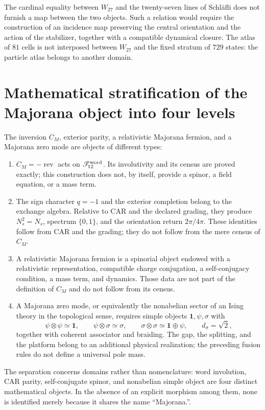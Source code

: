 The cardinal equality between \(W_{27}\) and the twenty-seven lines of Schläfli
does not furnish a map between the two objects. Such a relation would require
the construction of an incidence map preserving the central orientation and the
action of the stabilizer, together with a compatible dynamical closure. The atlas
of \(81\) cells is not interposed between \(W_{27}\) and the fixed stratum of
\(729\) states: the particle atlas belongs to another domain.

\section[Majorana Levels]{Mathematical stratification of the Majorana object into four levels}
\label{sec:cuatro-niveles-majorana}

The inversion \(C_M\), exterior parity, a relativistic Majorana
fermion, and a Majorana zero mode are objects of different types:

\begin{enumerate}
 \item \(C_M=-\operatorname{rev}\) acts on
 \(\mathscr T_{12}^{\rm word}\). Its involutivity and its census are proved
 exactly; this construction does not, by itself, provide a spinor, a
 field equation, or a mass term.

 \item The sign character \(q=-1\) and the exterior completion belong
 to the exchange algebra. Relative to CAR and the declared grading, they
 produce \(N_s^2=N_s\), spectrum \(\{0,1\}\), and the orientation return
 \(2\pi/4\pi\). These identities follow from CAR and the grading; they do not
 follow from the
 mere census of \(C_M\).

 \item A relativistic Majorana fermion is a spinorial object endowed with a
 relativistic representation, compatible charge conjugation, a
 self-conjugacy condition, a mass term, and dynamics. Those data are not part of
 the definition of \(C_M\) and do not follow from its census.

 \item A Majorana zero mode, or equivalently the nonabelian sector of
 an Ising theory in the topological sense, requires simple objects
 \(\mathbf 1,\psi,\sigma\) with
 \[
  \psi\otimes\psi\simeq\mathbf 1,\qquad
  \psi\otimes\sigma\simeq\sigma,\qquad
  \sigma\otimes\sigma\simeq\mathbf 1\oplus\psi,\qquad
  d_\sigma=\sqrt2,
 \]
 together with coherent associator and braiding. The gap, the splitting, and the
 platform belong to an additional physical realization; the preceding
 fusion rules do not define a universal pole mass.
\end{enumerate}

The separation concerns domains rather than nomenclature: word involution,
CAR parity, self-conjugate spinor, and nonabelian simple object are four distinct
mathematical objects. In the absence of an explicit morphism among them, none
is identified merely because it shares the name “Majorana.”.
